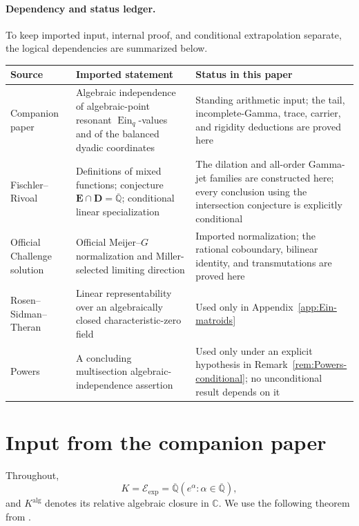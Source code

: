 \documentclass[11pt]{article}
\theoremstyle{keio}
\theoremstyle{definition}
\theoremstyle{remark}
\newcommand{\Qbar}{\overline{\mathbb Q}}
\newcommand{\C}{\mathbb C}
\newcommand{\Ein}{\operatorname{Ein}}
\newcommand{\Eexp}{\mathcal E_{\mathrm{exp}}}
\begin{document}
\paragraph{Dependency and status ledger.}
To keep imported input, internal proof, and conditional extrapolation
separate, the logical dependencies are summarized below.
\begin{center}
\small
\begin{tabular}{@{}
 >{\raggedright\arraybackslash}p{}
 >{\raggedright\arraybackslash}p{}
 >{\raggedright\arraybackslash}p{}@{}}
\toprule
Source & Imported statement & Status in this paper\\
\midrule
Companion paper \cite[Thms.~1.4, 5.1 and Lem.~11.2]{KEIO2026I}
& Algebraic independence of algebraic-point resonant \(\Ein_q\)-values
and of the balanced dyadic coordinates
& Standing arithmetic input; the tail, incomplete-Gamma, trace, carrier,
and rigidity deductions are proved here\\
Fischler--Rivoal \cite{FischlerRivoalMixed2024}
& Definitions of mixed functions; conjecture
\(\mathbf E\cap\mathbf D=\Qbar\); conditional linear specialization
& The dilation and all-order Gamma-jet families are constructed here;
every conclusion using the intersection conjecture is explicitly
conditional\\
Official Challenge solution \cite[\S5.2]{RamanujanOfficial2026}
& Official Meijer--\(G\) normalization and Miller-selected limiting direction
& Imported normalization; the rational coboundary, bilinear identity, and
transmutations are proved here\\
Rosen--Sidman--Theran \cite[Thm.~1.10]{RosenSidmanTheran2025}
& Linear representability over an algebraically closed characteristic-zero
field
& Used only in Appendix~\ref{app:Ein-matroids}\\
Powers \cite[\S5]{Powers2025}
& A concluding multisection algebraic-independence assertion
& Used only under an explicit hypothesis in
Remark~\ref{rem:Powers-conditional}; no unconditional result depends on it\\
\bottomrule
\end{tabular}
\end{center}

\section{Input from the companion paper}
\label{sec:input}

Throughout,
\[
 K=\Eexp=\Qbar(e^\alpha:\alpha\in\Qbar),
\]
and \(K^{\mathrm{alg}}\) denotes its relative algebraic closure in \(\C\).
We use the following theorem from \cite[Thm.~5.1]{KEIO2026I}.
\end{document}
